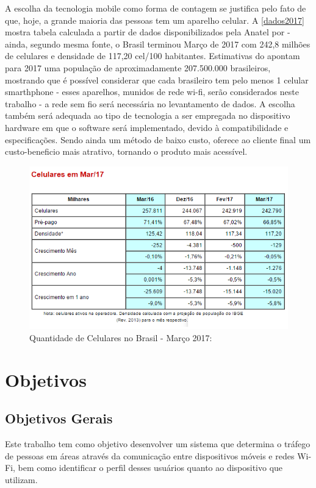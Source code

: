 A escolha da tecnologia mobile como forma de contagem se justifica pelo fato de que, hoje, a grande maioria das pessoas tem um aparelho celular. A \autoref{dados2017} mostra tabela calculada a partir de dados disponibilizados pela Anatel por  - ainda, segundo mesma fonte, o Brasil terminou Março de 2017 com 242,8 milhões de celulares e densidade de 117,20 cel/100 habitantes. Estimativas do  apontam para 2017 uma população de aproximadamente 207.500.000 brasileiros, mostrando que é possível considerar que cada brasileiro tem pelo menos 1 celular smarthphone - esses aparelhos, munidos de rede wi-fi, serão considerados neste trabalho - a rede sem fio será necessária no levantamento de dados. A escolha também será adequada ao tipo de tecnologia a ser empregada no dispositivo hardware em que o software será implementado, devido à compatibilidade e especificações. Sendo ainda um método de baixo custo, oferece ao cliente final um custo-beneficio mais atrativo, tornando o produto mais acessível.

\begin{figure}[htb]
  \caption{\label{dados2017}Quantidade de Celulares no Brasil - Março 2017:}
  \begin{center}
    \includegraphics[width=1.0\textwidth]{img/dados2017.png}
  \end{center}
\end{figure}


\section{Objetivos}
\label{objetivos}

\subsection{Objetivos Gerais}
Este trabalho tem como objetivo desenvolver um sistema que determina o tráfego de pessoas em áreas através da comunicação
entre dispositivos móveis e redes Wi-Fi, bem como identificar o perfil desses usuários quanto ao dispositivo que utilizam.

